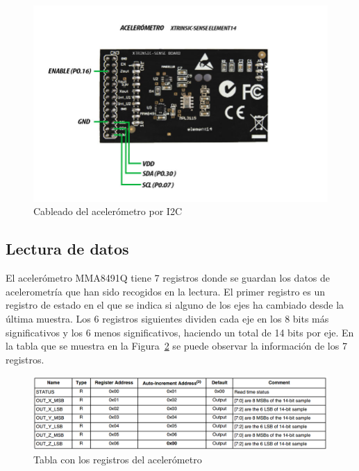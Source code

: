 \begin{figure}[h]%
	\centering
    \includegraphics[scale=0.6]{figures/estructura_xtrinsic.jpg} %
    \caption[Cableado del acelerómetro por I2C]{Cableado del acelerómetro por I2C}
   	\label{figuraXtrinsic}
\end{figure}

\subsection{Lectura de datos}
\label{makereference5.1.1}

El acelerómetro MMA8491Q tiene 7 registros donde se guardan los datos de acelerometría que han sido recogidos en la lectura. El primer registro es un registro de estado en el que se indica si alguno de los ejes ha cambiado desde la última muestra. Los 6 registros siguientes dividen cada eje en los 8 bits más significativos y los 6 menos significativos, haciendo un total de 14 bits por eje. En la tabla que se muestra en la Figura~\ref{figuraRegistrosAcc} se puede observar la información de los 7 registros.

\begin{figure}[h]%
	\centering
    \includegraphics[width=\textwidth]{figures/registros_Acelerometro.png} %
    \caption[Registros del acelerómetro]{Tabla con los registros del acelerómetro~\cite{DatasheetAcc}}
   	\label{figuraRegistrosAcc}
\end{figure}

